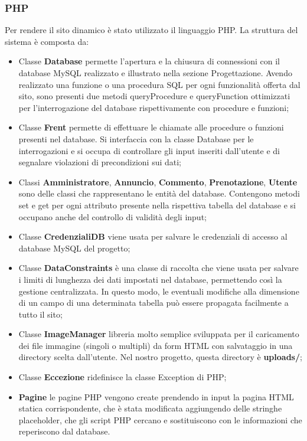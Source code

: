 \documentclass[1_relazione.tex]{subfiles}
\begin{document}
\subsubsection{PHP}
Per rendere il sito dinamico \`{e} stato utilizzato il linguaggio PHP.
La struttura del sistema \`{e} composta da:
\begin{itemize}
    \item Classe \textbf{Database} permette l'apertura e la chiusura di connessioni con il database MySQL realizzato e illustrato nella sezione Progettazione.
    Avendo realizzato una funzione o una procedura SQL per ogni funzionalit\`{a} offerta dal sito, sono presenti due metodi queryProcedure e queryFunction ottimizzati per l'interrogazione del database rispettivamente con procedure e funzioni;
    \item Classe \textbf{Frent} permette di effettuare le chiamate alle procedure o funzioni presenti nel database. Si interfaccia con la classe Database per le interrogazioni e si occupa di controllare gli input inseriti dall'utente e di segnalare violazioni di precondizioni sui dati;
    \item Classi \textbf{Amministratore}, \textbf{Annuncio}, \textbf{Commento}, \textbf{Prenotazione}, \textbf{Utente} sono delle classi che rappresentano le entit\`{a} del database. Contengono metodi set e get per ogni attributo presente nella rispettiva tabella del database e si occupano anche del controllo di validit\`{a} degli input;
    \item Classe \textbf{CredenzialiDB} viene usata per salvare le credenziali di accesso al database MySQL del progetto;
    \item Classe \textbf{DataConstraints} \`{e} una classe di raccolta che viene usata per salvare i limiti di lunghezza dei dati impostati nel database, permettendo cos\`{i} la gestione centralizzata. In questo modo, le eventuali modifiche alla dimensione di un campo di una determinata tabella pu\`{o} essere propagata facilmente a tutto il sito;
    \item Classe \textbf{ImageManager} libreria molto semplice sviluppata per il caricamento dei file immagine (singoli o multipli) da form HTML con salvataggio in una directory scelta dall'utente. Nel nostro progetto, questa directory è \textbf{uploads/};
    \item Classe \textbf{Eccezione} ridefinisce la classe Exception di PHP;
    \item \textbf{Pagine} le pagine PHP vengono create prendendo in input la pagina HTML statica corrispondente, che è stata modificata aggiungendo delle stringhe placeholder, che gli script PHP cercano e sostituiscono con le informazioni che reperiscono dal database.

\end{itemize}
\end{document}
